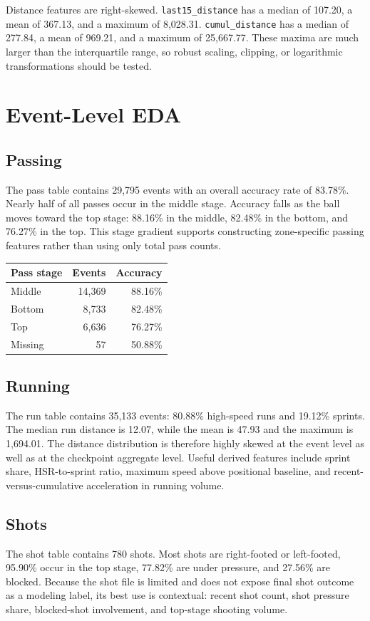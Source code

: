 \documentclass[11pt]{article}
\begin{document}
Distance features are right-skewed.
\texttt{last15\_distance} has a median of 107.20, a mean of 367.13, and a maximum of 8,028.31.
\texttt{cumul\_distance} has a median of 277.84, a mean of 969.21, and a maximum of 25,667.77.
These maxima are much larger than the interquartile range, so robust scaling, clipping, or logarithmic transformations should be tested.

\section{Event-Level EDA}
\subsection{Passing}
The pass table contains 29,795 events with an overall accuracy rate of 83.78\%.
Nearly half of all passes occur in the middle stage.
Accuracy falls as the ball moves toward the top stage: 88.16\% in the middle, 82.48\% in the bottom, and 76.27\% in the top.
This stage gradient supports constructing zone-specific passing features rather than using only total pass counts.

\begin{longtable}{lrr}
\toprule
Pass stage & Events & Accuracy \\
\midrule
Middle & 14,369 & 88.16\% \\
Bottom & 8,733 & 82.48\% \\
Top & 6,636 & 76.27\% \\
Missing & 57 & 50.88\% \\
\bottomrule
\end{longtable}

\subsection{Running}
The run table contains 35,133 events: 80.88\% high-speed runs and 19.12\% sprints.
The median run distance is 12.07, while the mean is 47.93 and the maximum is 1,694.01.
The distance distribution is therefore highly skewed at the event level as well as at the checkpoint aggregate level.
Useful derived features include sprint share, HSR-to-sprint ratio, maximum speed above positional baseline, and recent-versus-cumulative acceleration in running volume.

\subsection{Shots}
The shot table contains 780 shots.
Most shots are right-footed or left-footed, 95.90\% occur in the top stage, 77.82\% are under pressure, and 27.56\% are blocked.
Because the shot file is limited and does not expose final shot outcome as a modeling label, its best use is contextual: recent shot count, shot pressure share, blocked-shot involvement, and top-stage shooting volume.
\end{document}
